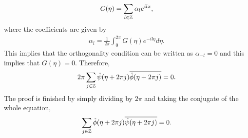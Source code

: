 \begin{questions}
\begin{solution}
\begin{align*}
G(\eta)=\sum_{l\in\mathbb{Z}}\alpha_le^{ilx},
\end{align*}
where the coefficients are given by
\begin{align*}
\alpha_l=\frac{1}{2\pi}\int_0^{2\pi}G(\eta)e^{-il\eta}d\eta.
\end{align*}
This implies that the orthogonality condition can be written as $\alpha_{-l}=0$ and this implies that $G(\eta)=0$. Therefore,
\begin{align*}
2\pi\sum_{j\in\mathbb{Z}}\hat{\psi}(\eta+2\pi j)\overline{\hat{\phi}(\eta+2\pi j)}=0.
\end{align*}
The proof is finished by simply dividing by $2\pi$ and taking the conjugate of the whole equation,
\begin{align*}
\sum_{j\in\mathbb{Z}}\hat{\phi}(\eta+2\pi j)\overline{\hat{\psi}(\eta+2\pi j)}=0.
\end{align*}
\end{solution}
\end{questions}

